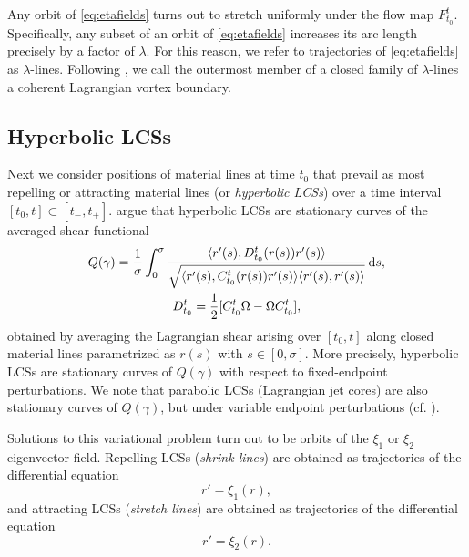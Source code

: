 \documentclass[5p]{elsarticle}
\begin{document}
Any orbit of \cref{eq:etafields} turns out to stretch uniformly under the flow map $F_{t_0}^t$. Specifically, any subset of an orbit of \cref{eq:etafields} increases its arc length precisely by a factor of $\lambda$. For this reason, we refer to trajectories of \cref{eq:etafields} as $\lambda$-lines. Following \citet{haller13:_coher_lagran,haller14:_adden_coher_lagran}, we call the outermost member of a closed family of $\lambda$-lines a coherent Lagrangian vortex boundary.

\subsection{Hyperbolic LCSs}
\label{sec:Hyperbolic LCSs}

Next we consider positions of material lines at time $t_0$ that prevail as most repelling or attracting material lines (or \emph{hyperbolic LCSs}) over a time interval $[t_0,t] \subset [t_-,t_+]$. \citet{farazmand14:_shearless} argue that hyperbolic LCSs are stationary curves of the averaged shear functional
\begin{gather*}
Q(\gamma) = \frac{1}{\sigma} \int_0^\sigma \frac{\langle r'(s),D_{t_0}^t(r(s)) r'(s)\rangle}{\sqrt{\langle r'(s),C_{t_0}^t(r(s)) r'(s)\rangle\langle r'(s),r'(s)\rangle}}\dif s,\\
D_{t_0}^t = \frac12 [C_{t_0}^t \Omega - \Omega C_{t_0}^t],
\end{gather*}
obtained by averaging the Lagrangian shear arising over $[t_0,t]$ along closed material lines parametrized as $r(s)$ with $s \in [0,\sigma]$. More precisely, hyperbolic LCSs are stationary curves of $Q(\gamma)$ with respect to fixed-endpoint perturbations. We note that parabolic LCSs (Lagrangian jet cores) are also stationary curves of $Q(\gamma)$, but under variable endpoint perturbations (cf. \citet{farazmand14:_shearless}).

Solutions to this variational problem turn out to be orbits of the $\xi_1$ or $\xi_2$ eigenvector field. Repelling LCSs (\emph{shrink lines}) are obtained as trajectories of the differential equation
\begin{equation}
r' = \xi_1(r),
\label{eq:shrink line}
\end{equation}
and attracting LCSs (\emph{stretch lines}) are obtained as trajectories of the differential equation
\begin{equation}
r' = \xi_2(r).
\label{eq:stretch line}
\end{equation}
\end{document}
